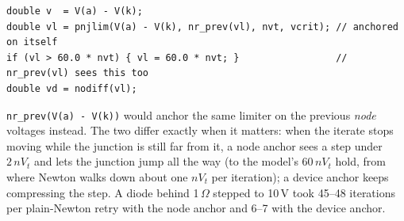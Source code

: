 \documentclass[11pt, a4paper]{article}
\newcommand{\code}[1]{\texttt{\small #1}}
\begin{document}
\begin{lstlisting}
double v  = V(a) - V(k);
double vl = pnjlim(V(a) - V(k), nr_prev(vl), nvt, vcrit); // anchored on itself
if (vl > 60.0 * nvt) { vl = 60.0 * nvt; }                 // nr_prev(vl) sees this too
double vd = nodiff(vl);
\end{lstlisting}

\code{nr\_prev(V(a) - V(k))} would anchor the same limiter on the previous
\textit{node} voltages instead. The two differ exactly when it matters: when the
iterate stops moving while the junction is still far from it, a node anchor sees
a step under $2\,nV_t$ and lets the junction jump all the way (to the model's
$60\,nV_t$ hold, from where Newton walks down about one $nV_t$ per iteration); a
device anchor keeps compressing the step. A diode behind 1\,$\Omega$ stepped to
10\,V took 45--48 iterations per plain-Newton retry with the node anchor and 6--7
with the device anchor.
\end{document}
